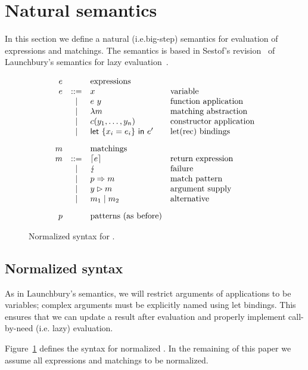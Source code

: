 \section{Natural semantics}\label{sec:bigstep}

In this section we define a natural (i.e.\@ big-step) semantics for
evaluation of expressions and matchings.  The semantics is based in
Sestof's revision~\cite{sestof_1997} of Launchbury's semantics for
lazy evaluation~\cite{launchbury_1993}.

\begin{figure}
  \[
    \begin{array}{rcll}
      e & &     \text{expressions} \\
      e & ::= &  x  & \text{variable} \\
      & | &  e~y & \text{function application} \\
      & | & \lambda m & \text{matching abstraction} \\
      & | & c(y_1,\ldots,y_n) & \text{constructor application} \\
      & | & \textsf{let}~\{x_i=e_i\}~\textsf{in}~e' & \text{let(rec) bindings} \\[2ex]
      m &  & \text{matchings} \\
      m & ::= & \left\lceil e\right\rceil & \text{return expression}\\
      & | & \lightning & \text{failure} \\
      & | & p \Rightarrow m & \text{match pattern} \\
      & | & y\rhd m & \text{argument supply}\\
      & | & m_1 \mid m_2 & \text{alternative}\\[2ex]
      p & & \text{patterns (as before)}
  \end{array}
\]
\caption{Normalized syntax for \lambdaPMC.}\label{fig:syntax-normalized}
\end{figure}

\subsection{Normalized syntax}
As in Launchbury's semantics, we will restrict arguments of
applications to be variables; complex arguments must be explicitly
named using let bindings.  This ensures that we can update a result
after evaluation and properly implement call-by-need (i.e. lazy)
evaluation.

Figure~\ref{fig:syntax-normalized} defines the syntax for normalized
\lambdaPMC. In the remaining of this paper we assume all expressions
and matchings to be normalized.

